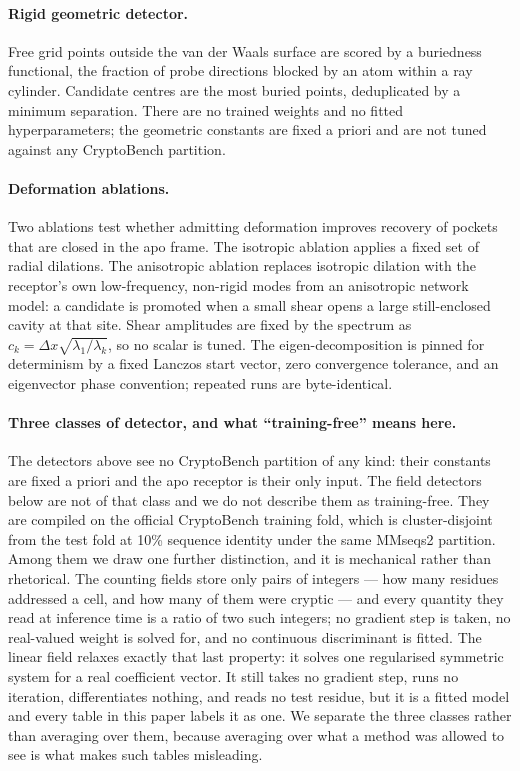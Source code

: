 \documentclass[11pt]{article}
\begin{document}
\paragraph{Rigid geometric detector.} Free grid points outside the van der Waals
surface are scored by a buriedness functional, the fraction of probe directions
blocked by an atom within a ray cylinder. Candidate centres are the most buried
points, deduplicated by a minimum separation. There are no trained weights and no
fitted hyperparameters; the geometric constants are fixed a priori and are not
tuned against any CryptoBench partition.

\paragraph{Deformation ablations.} Two ablations test whether admitting
deformation improves recovery of pockets that are closed in the apo frame. The
isotropic ablation applies a fixed set of radial dilations. The anisotropic
ablation replaces isotropic dilation with the receptor's own low-frequency,
non-rigid modes from an anisotropic network model: a candidate is promoted when a
small shear opens a large still-enclosed cavity at that site. Shear amplitudes
are fixed by the spectrum as \(c_k=\Delta x\sqrt{\lambda_1/\lambda_k}\), so no
scalar is tuned. The eigen-decomposition is pinned for determinism by a fixed
Lanczos start vector, zero convergence tolerance, and an eigenvector phase
convention; repeated runs are byte-identical.

\paragraph{Three classes of detector, and what ``training-free'' means here.}
The detectors above see no CryptoBench partition of any kind: their constants are
fixed a priori and the apo receptor is their only input. The field detectors
below are not of that class and we do not describe them as training-free. They
are compiled on the official CryptoBench training fold, which is cluster-disjoint
from the test fold at 10\% sequence identity under the same MMseqs2 partition.
Among them we draw one further distinction, and it is mechanical rather than
rhetorical. The counting fields store only pairs of integers --- how many
residues addressed a cell, and how many of them were cryptic --- and every
quantity they read at inference time is a ratio of two such integers; no gradient
step is taken, no real-valued weight is solved for, and no continuous
discriminant is fitted. The linear field relaxes exactly that last property: it
solves one regularised symmetric system for a real coefficient vector. It still
takes no gradient step, runs no iteration, differentiates nothing, and reads no
test residue, but it is a fitted model and every table in this paper labels it as
one. We separate the three classes rather than averaging over them, because
averaging over what a method was allowed to see is what makes such tables
misleading.
\end{document}
